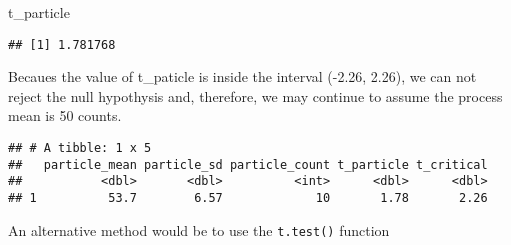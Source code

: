 \documentclass[]{book}
\newenvironment{Shaded}{\begin{snugshade}}{\end{snugshade}}
\newcommand{\DataTypeTok}[1]{\textcolor[rgb]{0.13,0.29,0.53}{#1}}
\newcommand{\DecValTok}[1]{\textcolor[rgb]{0.00,0.00,0.81}{#1}}
\newcommand{\FloatTok}[1]{\textcolor[rgb]{0.00,0.00,0.81}{#1}}
\newcommand{\KeywordTok}[1]{\textcolor[rgb]{0.13,0.29,0.53}{\textbf{#1}}}
\newcommand{\NormalTok}[1]{#1}
\newcommand{\OperatorTok}[1]{\textcolor[rgb]{0.81,0.36,0.00}{\textbf{#1}}}
\newcommand{\StringTok}[1]{\textcolor[rgb]{0.31,0.60,0.02}{#1}}
\theoremstyle{definition}
\theoremstyle{definition}
\theoremstyle{definition}
\theoremstyle{remark}
\begin{document}
\begin{Shaded}
\begin{Highlighting}[]
\NormalTok{t_particle}
\end{Highlighting}
\end{Shaded}

\begin{verbatim}
## [1] 1.781768
\end{verbatim}

Becaues the value of t\_paticle is inside the interval (-2.26, 2.26), we
can not reject the null hypothysis and, therefore, we may continue to
assume the process mean is 50 counts.

\begin{Shaded}
\end{Shaded}

\begin{verbatim}
## # A tibble: 1 x 5
##   particle_mean particle_sd particle_count t_particle t_critical
##           <dbl>       <dbl>          <int>      <dbl>      <dbl>
## 1          53.7        6.57             10       1.78       2.26
\end{verbatim}

An alternative method would be to use the \texttt{t.test()} function

\begin{Shaded}
\end{Shaded}
\end{document}
